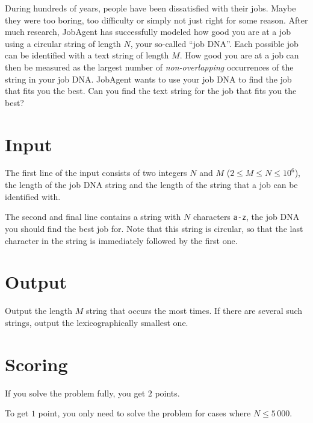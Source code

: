 During hundreds of years, people have been dissatisfied with their jobs.
Maybe they were too boring, too difficulty or simply not just right for some reason.
After much research, JobAgent has successfully modeled how good you are at a job using a circular string of length $N$, your so-called ``job DNA''.
Each possible job can be identified with a text string of length $M$.
How good you are at a job can then be measured as the largest number of \emph{non-overlapping} occurrences of the string in your job DNA.
JobAgent wants to use your job DNA to find the job that fits you the best.
Can you find the text string for the job that fits you the best?

\section*{Input}
The first line of the input consists of two integers $N$ and $M$ ($2 \le M \le N \le 10^6$), the length of the job DNA string and the length of the string that a job can be identified with.

The second and final line contains a string with $N$ characters \texttt{a-z}, the job DNA you should find the best job for.
Note that this string is circular, so that the last character in the string is immediately followed by the first one.

\section*{Output}
Output the length $M$ string that occurs the most times.
If there are several such strings, output the lexicographically smallest one.

\section*{Scoring}
If you solve the problem fully, you get $2$ points.

To get $1$ point, you only need to solve the problem for cases where $N \le 5\,000$.
